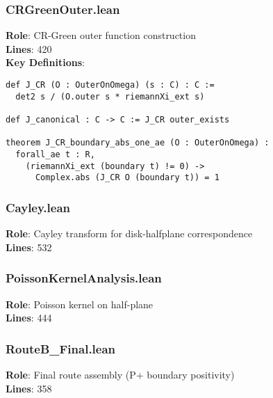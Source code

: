 \subsubsection{CRGreenOuter.lean}
\textbf{Role}: CR-Green outer function construction\\
\textbf{Lines}: 420\\
\textbf{Key Definitions}:
\begin{lstlisting}[language=Lean]
def J_CR (O : OuterOnOmega) (s : C) : C :=
  det2 s / (O.outer s * riemannXi_ext s)

def J_canonical : C -> C := J_CR outer_exists

theorem J_CR_boundary_abs_one_ae (O : OuterOnOmega) :
  forall_ae t : R,
    (riemannXi_ext (boundary t) != 0) ->
      Complex.abs (J_CR O (boundary t)) = 1
\end{lstlisting}

\subsubsection{Cayley.lean}
\textbf{Role}: Cayley transform for disk-halfplane correspondence\\
\textbf{Lines}: 532

\subsubsection{PoissonKernelAnalysis.lean}
\textbf{Role}: Poisson kernel on half-plane\\
\textbf{Lines}: 444

\subsubsection{RouteB\_Final.lean}
\textbf{Role}: Final route assembly (P+ boundary positivity)\\
\textbf{Lines}: 358


